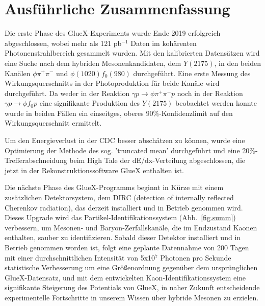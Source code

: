 \chapter{Ausf\"uhrliche Zusammenfassung}
\label{chap.zusammen}

Die erste Phase des GlueX-Experiments wurde Ende 2019 erfolgreich abgeschlossen, wobei mehr als 121 pb$^{-1}$ Daten im koh\"arenten Photonenstrahlbereich gesammelt wurden. Mit den kalibrierten Datens\"atzen wird eine Suche nach dem hybriden Mesonenkandidaten, dem $Y(2175)$, in den beiden Kan\"alen $\phi\pi^{+}\pi^{-}$ und $\phi(1020) f_0(980)$ durchgef\"uhrt. Eine erste Messung des Wirkungsquerschnitts in der Photoproduktion für beide Kan\"ale wird durchgef\"uhrt. Da weder in der Reaktion $\gamma p \rightarrow \phi \pi^+\pi^- p$ noch in der Reaktion $\gamma p \rightarrow \phi f_0 p$ eine signifikante Produktion des $Y(2175)$ beobachtet werden konnte wurde in beiden F\"allen ein einseitges, oberes $90\%$-Konfidenzlimit auf den Wirkungsquerschnitt ermittelt.
~\par Um den Energieverlust in der CDC besser absch\"atzen zu k\"onnen, wurde eine Optimierung der Methode des sog. 'truncated mean' durchgef\"uhrt und eine 20$\%$-Trefferabschneidung beim High Tale der dE/dx-Verteilung abgeschlossen, die jetzt in der Rekonstruktionssoftware GlueX enthalten ist.
~\par Die n\"achste Phase des GlueX-Programms beginnt in K\"urze mit einem zus\"atzlichen Detektorsystem, dem DIRC (detection of internally reflected Cherenkov radiation), das derzeit installiert und in Betrieb genommen wird. Dieses Upgrade wird das Partikel-Identifikationssystem (Abb.~\ref{fig.summ}) verbessern, um Mesonen- und Baryon-Zerfallskan\"ale, die im Endzustand Kaonen enthalten, sauber zu identifizieren. Sobald dieser Detektor installiert und in Betrieb genommen worden ist, folgt eine geplante Datennahme von 200 Tagen mit einer durchschnittlichen Intensit\"at von 5x10$^7$ Photonen pro Sekunde statistische Verbesserung um eine Gr\"oßenordnung gegen\"uber dem urspr\"unglichen GlueX-Datensatz, und mit dem entwickelten Kaon-Identifikationssystem eine signifikante Steigerung des Potentials von GlueX, in naher Zukunft entscheidende experimentelle Fortschritte in unserem Wissen \"uber hybride Mesonen zu erzielen.